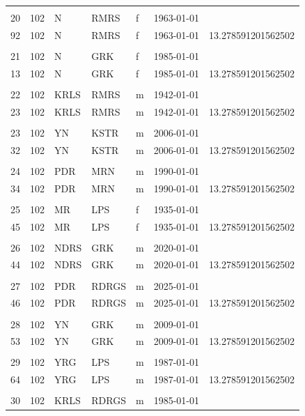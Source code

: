 \documentclass[
  12pt,
]{book}
\begin{document}
\begin{table}[t]
\begin{tabular*}{1\linewidth}{@{\extracolsep{\fill}}rrlllrr}
 &  &  &  &  &  &  \\ 
20 & 102 & N & RMRS & f & 1963-01-01 &  \\ 
92 & 102 & N & RMRS & f & 1963-01-01 & 13.278591201562502 \\ 
 &  &  &  &  &  &  \\ 
21 & 102 & N & GRK & f & 1985-01-01 &  \\ 
13 & 102 & N & GRK & f & 1985-01-01 & 13.278591201562502 \\ 
 &  &  &  &  &  &  \\ 
22 & 102 & KRLS & RMRS & m & 1942-01-01 &  \\ 
23 & 102 & KRLS & RMRS & m & 1942-01-01 & 13.278591201562502 \\ 
 &  &  &  &  &  &  \\ 
23 & 102 & YN & KSTR & m & 2006-01-01 &  \\ 
32 & 102 & YN & KSTR & m & 2006-01-01 & 13.278591201562502 \\ 
 &  &  &  &  &  &  \\ 
24 & 102 & PDR & MRN & m & 1990-01-01 &  \\ 
34 & 102 & PDR & MRN & m & 1990-01-01 & 13.278591201562502 \\ 
 &  &  &  &  &  &  \\ 
25 & 102 & MR & LPS & f & 1935-01-01 &  \\ 
45 & 102 & MR & LPS & f & 1935-01-01 & 13.278591201562502 \\ 
 &  &  &  &  &  &  \\ 
26 & 102 & NDRS & GRK & m & 2020-01-01 &  \\ 
44 & 102 & NDRS & GRK & m & 2020-01-01 & 13.278591201562502 \\ 
 &  &  &  &  &  &  \\ 
27 & 102 & PDR & RDRGS & m & 2025-01-01 &  \\ 
46 & 102 & PDR & RDRGS & m & 2025-01-01 & 13.278591201562502 \\ 
 &  &  &  &  &  &  \\ 
28 & 102 & YN & GRK & m & 2009-01-01 &  \\ 
53 & 102 & YN & GRK & m & 2009-01-01 & 13.278591201562502 \\ 
 &  &  &  &  &  &  \\ 
29 & 102 & YRG & LPS & m & 1987-01-01 &  \\ 
64 & 102 & YRG & LPS & m & 1987-01-01 & 13.278591201562502 \\ 
 &  &  &  &  &  &  \\ 
30 & 102 & KRLS & RDRGS & m & 1985-01-01 &  \\ 

\end{tabular*}
\end{table}
\end{document}
